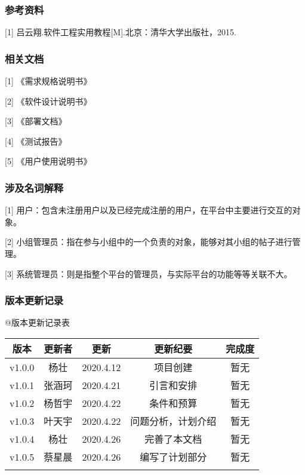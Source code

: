 \documentclass[
]{article}
\begin{document}
\hypertarget{header-n7}{%
\subsubsection{参考资料}\label{header-n7}}

{[}1{]} 吕云翔.软件工程实用教程{[}M{]}.北京：清华大学出版社，2015.

\hypertarget{header-n9}{%
\subsubsection{相关文档}\label{header-n9}}

{[}1{]} 《需求规格说明书》

{[}2{]} 《软件设计说明书》

{[}3{]} 《部署文档》

{[}4{]} 《测试报告》

{[}5{]} 《用户使用说明书》

\hypertarget{header-n15}{%
\subsubsection{涉及名词解释}\label{header-n15}}

{[}1{]}
用户：包含未注册用户以及已经完成注册的用户，在平台中主要进行交互的对象。

{[}2{]}
小组管理员：指在参与小组中的一个负责的对象，能够对其小组的帖子进行管理。

{[}3{]}
系统管理员：则是指整个平台的管理员，与实际平台的功能等等关联不大。

\hypertarget{header-n19}{%
\subsubsection{版本更新记录}\label{header-n19}}

@版本更新记录表

\begin{longtable}[]{@{}ccccc@{}}
\toprule
版本 & 更新者 & 更新 & 更新纪要 & 完成度\tabularnewline
\midrule
\endhead
v1.0.0 & 杨壮 & 2020.4.12 & 项目创建 & 暂无\tabularnewline
v1.0.1 & 张涵珂 & 2020.4.21 & 引言和安排 & 暂无\tabularnewline
v1.0.2 & 杨哲宇 & 2020.4.22 & 条件和预算 & 暂无\tabularnewline
v1.0.3 & 叶天宇 & 2020.4.22 & 问题分析，计划介绍 & 暂无\tabularnewline
v1.0.4 & 杨壮 & 2020.4.26 & 完善了本文档 & 暂无\tabularnewline
v1.0.5 & 蔡星晨 & 2020.4.26 & 编写了计划部分 & 暂无\tabularnewline
& & & &\tabularnewline
\bottomrule
\end{longtable}
\end{document}
